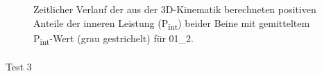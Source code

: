 \documentclass[
  letterpaper,
  DIV=11]{scrartcl}
\makeatletter
\let\oldparagraph\paragraph
\renewcommand{\paragraph}{
    \@ifstar
      \xxxParagraphStar
      \xxxParagraphNoStar
  }
\newcommand{\xxxParagraphStar}[1]{\oldparagraph*{#1}\mbox{}}
\newcommand{\xxxParagraphNoStar}[1]{\oldparagraph{#1}\mbox{}}
\makeatother
\begin{document}
\begin{figure}


\caption{\label{fig-PInt_Kinematik_01_2}Zeitlicher Verlauf der aus der
3D-Kinematik berechneten positiven Anteile der inneren Leistung
(P\textsubscript{int}) beider Beine mit gemitteltem
P\textsubscript{int}-Wert (grau gestrichelt) für 01\_2.}

\end{figure}%

\paragraph{Test 3}
\end{document}
